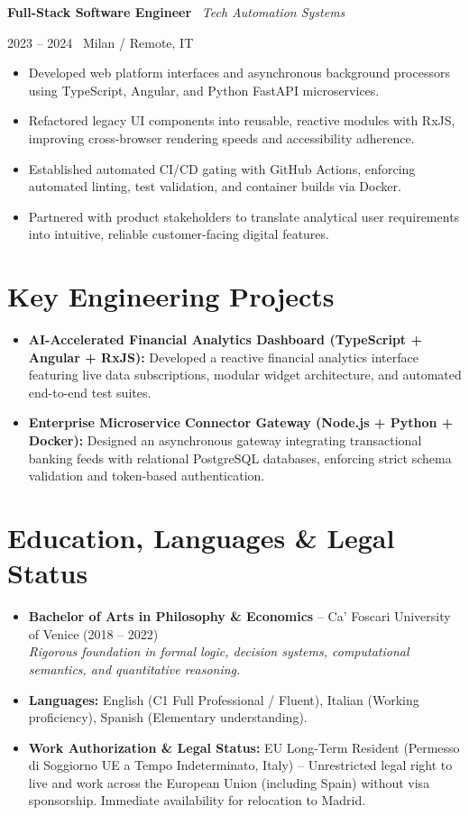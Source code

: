 \documentclass[a4paper,10pt]{article}
\newcommand{\role}[4]{%
  \vspace{2pt}\noindent
  \begin{minipage}[t]{0.70\textwidth}\raggedright\textbf{#1} \textbullet\ \textit{#3}\end{minipage}%
  \hfill
  \begin{minipage}[t]{0.28\textwidth}\raggedleft\footnotesize\color{gray}#2 \textbullet\ #4\end{minipage}%
  \vspace{1pt}%
}
\begin{document}
\vspace{3pt}
\role{Full-Stack Software Engineer}{2023 -- 2024}{Tech Automation Systems}{Milan / Remote, IT}
\begin{itemize}
  \item Developed web platform interfaces and asynchronous background processors using TypeScript, Angular, and Python FastAPI microservices.
  \item Refactored legacy UI components into reusable, reactive modules with RxJS, improving cross-browser rendering speeds and accessibility adherence.
  \item Established automated CI/CD gating with GitHub Actions, enforcing automated linting, test validation, and container builds via Docker.
  \item Partnered with product stakeholders to translate analytical user requirements into intuitive, reliable customer-facing digital features.
\end{itemize}

\section{Key Engineering Projects}
\begin{itemize}
  \item \textbf{AI-Accelerated Financial Analytics Dashboard (TypeScript + Angular + RxJS):} Developed a reactive financial analytics interface featuring live data subscriptions, modular widget architecture, and automated end-to-end test suites.
  \item \textbf{Enterprise Microservice Connector Gateway (Node.js + Python + Docker):} Designed an asynchronous gateway integrating transactional banking feeds with relational PostgreSQL databases, enforcing strict schema validation and token-based authentication.
\end{itemize}

\section{Education, Languages \& Legal Status}
\begin{itemize}
  \item \textbf{Bachelor of Arts in Philosophy \& Economics} -- Ca' Foscari University of Venice (2018 -- 2022) \\
  \textit{Rigorous foundation in formal logic, decision systems, computational semantics, and quantitative reasoning.}
  \item \textbf{Languages:} English (C1 Full Professional / Fluent), Italian (Working proficiency), Spanish (Elementary understanding).
  \item \textbf{Work Authorization \& Legal Status:} EU Long-Term Resident (Permesso di Soggiorno UE a Tempo Indeterminato, Italy) -- Unrestricted legal right to live and work across the European Union (including Spain) without visa sponsorship. Immediate availability for relocation to Madrid.
\end{itemize}
\end{document}
